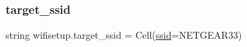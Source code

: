 \mbox{\label{namespacewifisetup_ab08d35f8dc6e6fb77b0af4052fac39a0}} 
\subsubsection{\texorpdfstring{target\+\_\+ssid}{target\_ssid}}
{\footnotesize\ttfamily string wifisetup.\+target\+\_\+ssid = \textquotesingle{}Cell(\hyperlink{namespacewifisetup_a4bc2f11329825548456f3142bdee0089}{ssid}=N\+E\+T\+G\+E\+A\+R33)\textquotesingle{}}

